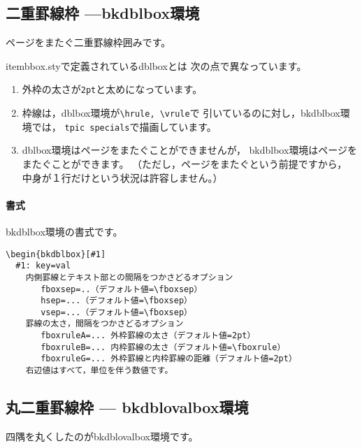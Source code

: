 \documentclass[a4j,fleqn]{jarticle}
\begin{document}


\subsection{二重罫線枠 ---\textsf{bkdblbox}環境}
ページをまたぐ二重罫線枠囲みです。



\textsf{itembbox.sty}で定義されている\textsf{dblbox}とは
次の点で異なっています。

\begin{enumerate}[1.~]
  \item 外枠の太さが\texttt{2pt}と太めになっています。
  \item 枠線は，\textsf{dblbox}環境が\verb+\hrule, \vrule+で
    引いているのに対し，\textsf{bkdblbox}環境では，
    \texttt{tpic specials}で描画しています。
  \item \textsf{dblbox}環境はページをまたぐことができませんが，
    \textsf{bkdblbox}環境はページをまたぐことができます。
    （ただし，ページをまたぐという前提ですから，
    中身が１行だけという状況は許容しません。）
\end{enumerate}

\paragraph{書式}
\textsf{bkdblbox}環境の書式です。

\begin{boxnote}
\begin{verbatim}
\begin{bkdblbox}[#1]
  #1: key=val
    内側罫線とテキスト部との間隔をつかさどるオプション
       fboxsep=..（デフォルト値=\fboxsep）
       hsep=...（デフォルト値=\fboxsep）
       vsep=...（デフォルト値=\fboxsep）
    罫線の太さ，間隔をつかさどるオプション
       fboxruleA=... 外枠罫線の太さ（デフォルト値=2pt）
       fboxruleB=... 内枠罫線の太さ（デフォルト値=\fboxrule）
       fboxruleG=... 外枠罫線と内枠罫線の距離（デフォルト値=2pt）
    右辺値はすべて，単位を伴う数値です。
\end{verbatim}
\end{boxnote}

\subsection{丸二重罫線枠 --- \textsf{bkdblovalbox}環境}
四隅を丸くしたのが\textsf{bkdblovalbox}環境です。


\end{document}

